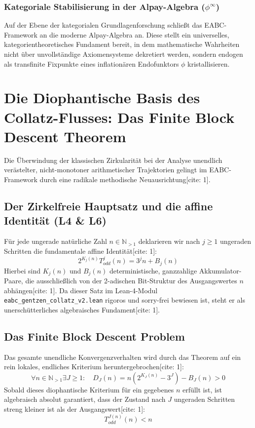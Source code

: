 \documentclass[11pt,a4paper]{article}
\begin{document}
	\subsubsection{Kategoriale Stabilisierung in der Alpay-Algebra ($\phi^\infty$)}
	Auf der Ebene der kategorialen Grundlagenforschung schließt das EABC-Framework an die moderne Alpay-Algebra an. Diese stellt ein universelles, kategorientheoretisches Fundament bereit, in dem mathematische Wahrheiten nicht über unvollständige Axiomensysteme dekretiert werden, sondern endogen als transfinite Fixpunkte eines inflationären Endofunktors $\phi$ kristallisieren.
	
	\section{Die Diophantische Basis des Collatz-Flusses: Das Finite Block Descent Theorem}
	Die Überwindung der klassischen Zirkularität bei der Analyse unendlich verästelter, nicht-monotoner arithmetischer Trajektorien gelingt im EABC-Framework durch eine radikale methodische Neuausrichtung[cite: 1].
	
	\subsection{Der Zirkelfreie Hauptsatz und die affine Identität (L4 \& L6)}
	Für jede ungerade natürliche Zahl $n\in\mathbb{N}_{>1}$ deklarieren wir nach $j\ge1$ ungeraden Schritten die fundamentale affine Identität[cite: 1]:
	\begin{equation}
		2^{K_{j}(n)}T_{odd}^{j}(n)=3^{j}n+B_{j}(n)
	\end{equation}
	Hierbei sind $K_{j}(n)$ und $B_{j}(n)$ deterministische, ganzzahlige Akkumulator-Paare, die ausschließlich von der 2-adischen Bit-Struktur des Ausgangswertes $n$ abhängen[cite: 1]. Da dieser Satz im Lean-4-Modul \texttt{eabc\_gentzen\_collatz\_v2.lean} rigoros und sorry-frei bewiesen ist, steht er als unerschütterliches algebraisches Fundament[cite: 1].
	
	\subsection{Das Finite Block Descent Problem}
	Das gesamte unendliche Konvergenzverhalten wird durch das Theorem auf ein rein lokales, endliches Kriterium heruntergebrochen[cite: 1]:
	\begin{equation}
		\forall n\in\mathbb{N}_{>1}\exists J\ge1: \quad D_{J}(n)=n(2^{K_{J}(n)}-3^{J})-B_{J}(n)>0
	\end{equation}
	Sobald dieses diophantische Kriterium für ein gegebenes $n$ erfüllt ist, ist algebraisch absolut garantiert, dass der Zustand nach $J$ ungeraden Schritten streng kleiner ist als der Ausgangswert[cite: 1]:
	\begin{equation}
		T_{odd}^{J(n)}(n)<n
	\end{equation}
	
\end{document}
